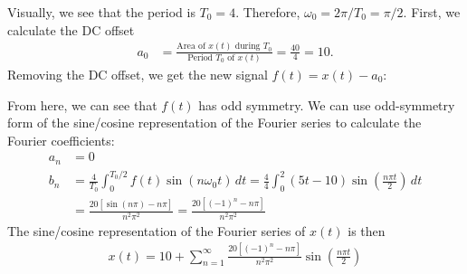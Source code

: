 \documentclass{report}
\begin{document}
\begin{solution}
    Visually, we see that the period is $T_0=4$. Therefore, $\omega_0=2\pi/T_0=\pi/2$. First, we calculate the DC offset 
    \begin{align*}
        a_0 &= \frac{\text{Area of } x(t) \text{ during } T_0}{\text{Period } T_0 \text{ of } x(t)} = \frac{40}{4} = 10.
    \end{align*}
    Removing the DC offset, we get the new signal $f(t)=x(t)-a_0$: \\
    \begin{center}
    \end{center}
    From here, we can see that $f(t)$ has odd symmetry. We can use odd-symmetry form of the sine/cosine representation of the 
    Fourier series to calculate the Fourier coefficients:
    \begin{align*}
        a_n &= 0 \\
        b_n &= \frac{4}{T_0}\int_{0}^{T_0/2}f(t)\sin(n\omega_0 t) \,dt = \frac{4}{4}\int_{0}^{2}(5t-10)\sin\left(\frac{n\pi t}{2}\right) \,dt \\
        &= \frac{20[\sin(n\pi)-n\pi]}{n^2\pi^2} = \frac{20[(-1)^n-n\pi]}{n^2\pi^2}
    \end{align*}
    The sine/cosine representation of the Fourier series of $x(t)$ is then
    \begin{align*}
        x(t) = 10 + \sum_{n=1}^{\infty} \frac{20[(-1)^n-n\pi]}{n^2\pi^2} \sin\left(\frac{n\pi t}{2}\right)
    \end{align*}
\end{solution}
\end{document}
